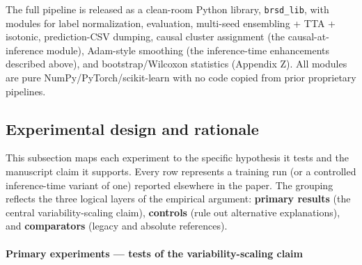 The full pipeline is released as a clean-room Python library,
\texttt{brsd\_lib}, with modules for label normalization, evaluation,
multi-seed ensembling + TTA + isotonic, prediction-CSV dumping, causal
cluster assignment (the causal-at-inference module), Adam-style smoothing (the inference-time enhancements described above), and
bootstrap/Wilcoxon statistics (Appendix Z). All modules are pure
NumPy/PyTorch/scikit-learn with no code copied from prior proprietary
pipelines.

\subsection{Experimental design and rationale}\label{experimental-design-and-rationale}

This subsection maps each experiment to the specific hypothesis it tests
and the manuscript claim it supports. Every row represents a training
run (or a controlled inference-time variant of one) reported elsewhere
in the paper. The grouping reflects the three logical layers of the
empirical argument: \textbf{primary results} (the central
variability-scaling claim), \textbf{controls} (rule out alternative explanations), and
\textbf{comparators} (legacy and absolute references).

\paragraph{Primary experiments --- tests of the variability-scaling
claim}\label{primary-experiments-tests-of-the-variability-scaling-claim}

